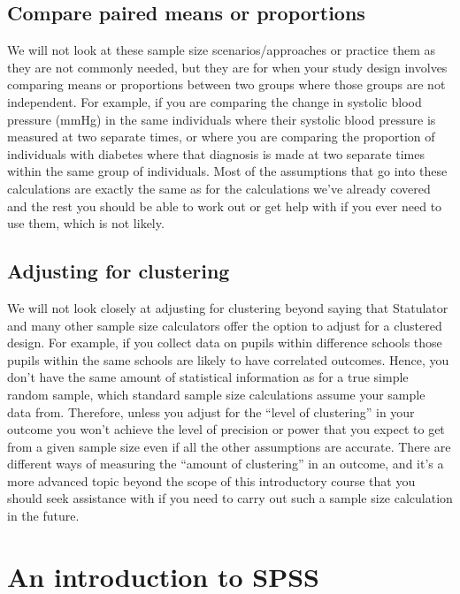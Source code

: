 \documentclass[
]{book}
\begin{document}
\hypertarget{compare-paired-means-or-proportions}{%
\section{Compare paired means or proportions}\label{compare-paired-means-or-proportions}}

We will not look at these sample size scenarios/approaches or practice them as they are not commonly needed, but they are for when your study design involves comparing means or proportions between two groups where those groups are not independent. For example, if you are comparing the change in systolic blood pressure (mmHg) in the same individuals where their systolic blood pressure is measured at two separate times, or where you are comparing the proportion of individuals with diabetes where that diagnosis is made at two separate times within the same group of individuals. Most of the assumptions that go into these calculations are exactly the same as for the calculations we've already covered and the rest you should be able to work out or get help with if you ever need to use them, which is not likely.

\hypertarget{adjusting-for-clustering}{%
\section{Adjusting for clustering}\label{adjusting-for-clustering}}

We will not look closely at adjusting for clustering beyond saying that Statulator and many other sample size calculators offer the option to adjust for a clustered design. For example, if you collect data on pupils within difference schools those pupils within the same schools are likely to have correlated outcomes. Hence, you don't have the same amount of statistical information as for a true simple random sample, which standard sample size calculations assume your sample data from. Therefore, unless you adjust for the ``level of clustering'' in your outcome you won't achieve the level of precision or power that you expect to get from a given sample size even if all the other assumptions are accurate. There are different ways of measuring the ``amount of clustering'' in an outcome, and it's a more advanced topic beyond the scope of this introductory course that you should seek assistance with if you need to carry out such a sample size calculation in the future.

\hypertarget{an-introduction-to-spss}{%
\chapter{An introduction to SPSS}\label{an-introduction-to-spss}}
\end{document}
